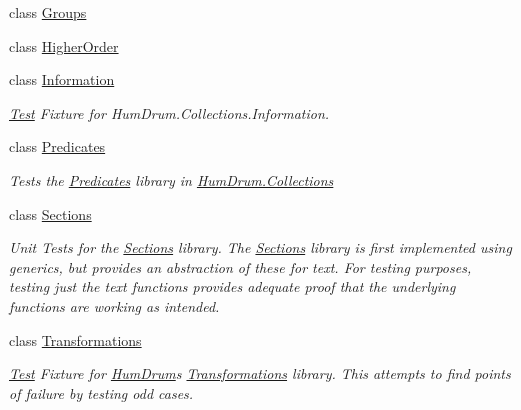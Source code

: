 \begin{DoxyCompactItemize}
\item 
class \hyperlink{classHumDrumTests_1_1Collections_1_1Groups}{Groups}
\item 
class \hyperlink{classHumDrumTests_1_1Collections_1_1HigherOrder}{Higher\+Order}
\item 
class \hyperlink{classHumDrumTests_1_1Collections_1_1Information}{Information}
\begin{DoxyCompactList}\small\item\em \hyperlink{classHumDrumTests_1_1Test}{Test} Fixture for Hum\+Drum.\+Collections.\+Information. \end{DoxyCompactList}\item 
class \hyperlink{classHumDrumTests_1_1Collections_1_1Predicates}{Predicates}
\begin{DoxyCompactList}\small\item\em Tests the \hyperlink{classHumDrumTests_1_1Collections_1_1Predicates}{Predicates} library in \hyperlink{namespaceHumDrum_1_1Collections}{Hum\+Drum.\+Collections} \end{DoxyCompactList}\item 
class \hyperlink{classHumDrumTests_1_1Collections_1_1Sections}{Sections}
\begin{DoxyCompactList}\small\item\em Unit Tests for the \hyperlink{classHumDrumTests_1_1Collections_1_1Sections}{Sections} library. The \hyperlink{classHumDrumTests_1_1Collections_1_1Sections}{Sections} library is first implemented using generics, but provides an abstraction of these for text. For testing purposes, testing just the text functions provides adequate proof that the underlying functions are working as intended. \end{DoxyCompactList}\item 
class \hyperlink{classHumDrumTests_1_1Collections_1_1Transformations}{Transformations}
\begin{DoxyCompactList}\small\item\em \hyperlink{classHumDrumTests_1_1Test}{Test} Fixture for \hyperlink{namespaceHumDrum}{Hum\+Drum}\textquotesingle{}s \hyperlink{classHumDrumTests_1_1Collections_1_1Transformations}{Transformations} library. This attempts to find points of failure by testing odd cases. \end{DoxyCompactList}\end{DoxyCompactItemize}
